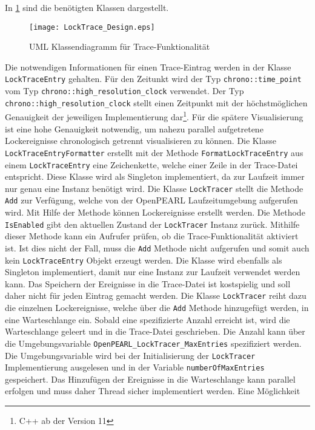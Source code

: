 In \cref{fig:LockTrace_Design} sind die benötigten Klassen dargestellt.
\begin{figure}[ht]
  \texttt{[image: LockTrace\_Design.eps]}
  \caption{UML Klassendiagramm für Trace-Funktionalität}
  \label{fig:LockTrace_Design}
\end{figure}
Die notwendigen Informationen für einen Trace-Eintrag werden in der Klasse
\texttt{LockTraceEntry} gehalten. Für den Zeitunkt wird der Typ 
\texttt{chrono::time\_point} vom Typ \texttt{chrono::high\_resolution\_clock}
verwendet. Der Typ \texttt{chrono::high\_resolution\_clock} stellt einen
Zeitpunkt mit der höchstmöglichen Genauigkeit der jeweiligen Implementierung
dar\footnote{C++ ab der Version 11}. Für die spätere Visualisierung ist eine
hohe Genauigkeit notwendig, um nahezu parallel aufgetretene Lockereignisse
chronologisch getrennt visualisieren zu können. Die Klasse
\texttt{LockTraceEntryFormatter} erstellt mit der Methode
\texttt{FormatLockTraceEntry} aus einem \texttt{LockTraceEntry} eine
Zeichenkette, welche einer Zeile in der Trace-Datei entspricht. Diese Klasse
wird als Singleton implementiert, da zur Laufzeit immer nur genau eine Instanz
benötigt wird. Die Klasse \texttt{LockTracer} stellt die Methode \texttt{Add}
zur Verfügung, welche von der OpenPEARL Laufzeitumgebung aufgerufen wird. Mit
Hilfe der Methode können Lockereignisse erstellt werden. Die Methode
\texttt{IsEnabled} gibt den aktuellen Zustand der \texttt{LockTracer} Instanz
zurück. Mithilfe dieser Methode kann ein Aufrufer prüfen, ob die
Trace-Funktionalität aktiviert ist. Ist dies nicht der Fall, muss die
\texttt{Add} Methode nicht aufgerufen und somit auch kein
\texttt{LockTraceEntry} Objekt erzeugt werden. Die Klasse wird ebenfalls als
Singleton implementiert, damit nur eine Instanz zur Laufzeit verwendet werden
kann. Das Speichern der Ereignisse in die Trace-Datei ist kostspielig und soll
daher nicht für jeden Eintrag gemacht werden. Die Klasse \texttt{LockTracer}
reiht dazu die einzelnen Lockereignisse, welche über die \texttt{Add} Methode
hinzugefügt werden, in eine Warteschlange ein. Sobald eine spezifizierte Anzahl
erreicht ist, wird die Warteschlange geleert und in die Trace-Datei geschrieben.
Die Anzahl kann über die Umgebungsvariable
\texttt{OpenPEARL\_LockTracer\_MaxEntries} spezifiziert werden. Die
Umgebungsvariable wird bei der Initialisierung der \texttt{LockTracer}
Implementierung ausgelesen und in der Variable \texttt{numberOfMaxEntries}
gespeichert. Das Hinzufügen der Ereignisse in die Warteschlange kann parallel
erfolgen und muss daher Thread sicher implementiert werden. Eine Möglichkeit
